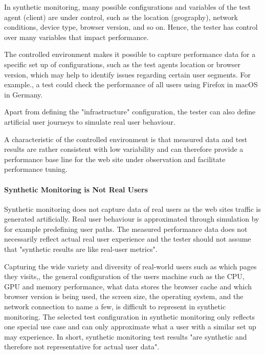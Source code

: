 In synthetic monitoring, many possible configurations and variables of the test agent (client) are under control, such as the location (geography), network conditions, device type, browser version, and so on. %
Hence, the tester has control over many variables that impact performance.

The controlled environment makes it possible to capture performance data for a specific set up of configurations, such as the test agents location or browser version, which may help to identify issues regarding certain user segments.  For example., a test could check the performance of all users using Firefox in macOS in Germany. %

Apart from defining the "infrastructure" configuration, the tester can also define artificial user journeys to simulate real user behaviour. %

A characteristic of the controlled environment is that measured data and test results are rather consistent with low variability and can therefore provide a performance base line for the web site under observation and facilitate performance tuning.%


\paragraph{Synthetic Monitoring is Not Real Users}

Synthetic monitoring does not capture data of real users as the web sites traffic is generated artificially.
Real user behaviour is approximated through simulation by for example predefining user paths.
The measured performance data does not necessarily reflect actual real user experience and the tester should not assume that "synthetic results are like real-user metrics". %

Capturing the wide variety and diversity of real-world users such as which pages they visits,, the general configuration of the users machine such as the CPU, GPU and memory performance, what data stores the browser cache and which browser version is being used, the screen size, the operating system, and the network connection to name a few, is difficult to represent in synthetic monitoring. %
The selected test configuration in synthetic monitoring only reflects one special use case and can only approximate what a user with a similar set up may experience. %
In short, synthetic monitoring test results "are synthetic and therefore not representative for actual user data".  %




